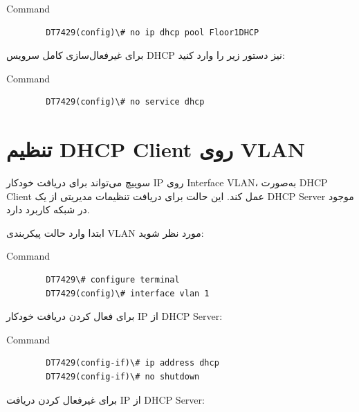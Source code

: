 \documentclass[11pt,letterpaper]{report}
\begin{document}
	\begin{latin}
		\begin{cliexample}{Command}
			\begin{verbatim}
		DT7429(config)\# no ip dhcp pool Floor1DHCP
			\end{verbatim}
		\end{cliexample}
	\end{latin}

	برای غیرفعال‌سازی کامل سرویس DHCP نیز دستور زیر را وارد کنید:

	\begin{latin}
		\begin{cliexample}{Command}
			\begin{verbatim}
		DT7429(config)\# no service dhcp
			\end{verbatim}
		\end{cliexample}
	\end{latin}


	\section{تنظیم DHCP Client روی VLAN}

	سوییچ می‌تواند برای دریافت خودکار IP روی Interface VLAN، به‌صورت
	DHCP Client عمل کند. این حالت برای دریافت تنظیمات مدیریتی از یک DHCP
	Server موجود در شبکه کاربرد دارد.

	ابتدا وارد حالت پیکربندی VLAN مورد نظر شوید:

	\begin{latin}
		\begin{cliexample}{Command}
			\begin{verbatim}
		DT7429\# configure terminal
		DT7429(config)\# interface vlan 1
			\end{verbatim}
		\end{cliexample}
	\end{latin}

	برای فعال کردن دریافت خودکار IP از DHCP Server:

	\begin{latin}
		\begin{cliexample}{Command}
			\begin{verbatim}
		DT7429(config-if)\# ip address dhcp
		DT7429(config-if)\# no shutdown
			\end{verbatim}
		\end{cliexample}
	\end{latin}

	برای غیرفعال کردن دریافت IP از DHCP Server:
\end{document}
